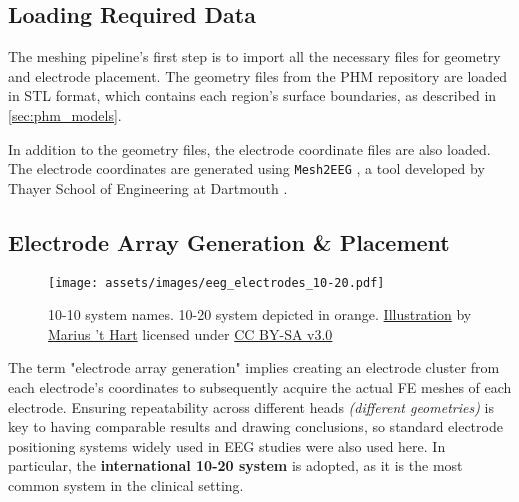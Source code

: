 \subsection{Loading Required Data}

The meshing pipeline's first step is to import all the necessary files for geometry and electrode placement. The geometry files from the \gls{PHM} repository \cite{ErikG.Lee2016} are loaded in \gls{STL} format, which contains each region's surface boundaries, as described in \ref{sec:phm_models}.

In addition to the geometry files, the electrode coordinate files are also loaded. The electrode coordinates are generated using \texttt{Mesh2EEG} \cite{Giacometti2014}, a tool developed by Thayer School of Engineering at Dartmouth \cite{mesh2eeg_web}.

\pagebreak
\subsection{Electrode Array Generation \& Placement}
\label{subsec:elec_placement}

\begin{wrapfigure}{l}{0.48\textwidth}
    \centering
    \texttt{[image: assets/images/eeg\_electrodes\_10-20.pdf]}
    \caption[10-10 system names. The orange electrodes are used in the 10-20 system.]{10-10 system names. 10-20 system depicted in orange. \href{http://www.mariusthart.net/downloads/eeg_electrodes_10-20.svg}{Illustration} by \href{http://www.beteredingen.nl}{Marius 't Hart} licensed under \href{http://creativecommons.org/licenses/by-sa/3.0/nl/deed.en_GB}{CC BY-SA v3.0}}
    \label{fig:electrodes_10-20}
\end{wrapfigure}

The term "electrode array generation" implies creating an electrode cluster from each electrode's coordinates to subsequently acquire the actual \gls{FE} meshes of each electrode. Ensuring repeatability across different heads \textit{(different geometries)} is key to having comparable results and drawing conclusions, so standard electrode positioning systems widely used in \gls{EEG} studies were also used here. In particular, the \textbf{international 10-20 system} \cite[chapter 13]{Malmivuo1995} is adopted, as it is the most common system in the clinical setting.

